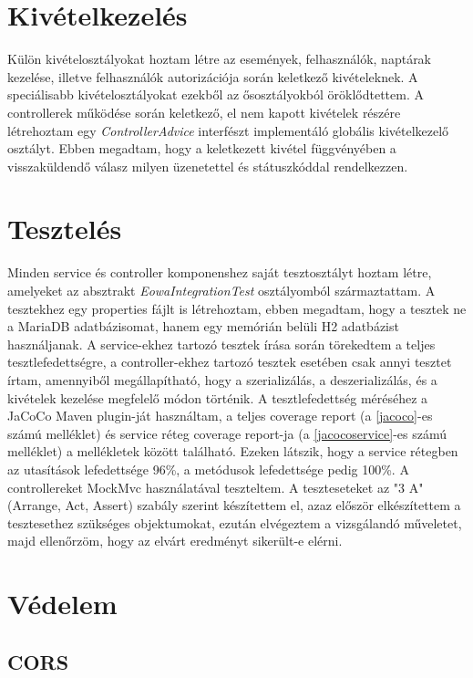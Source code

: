 \documentclass[a4paper,12pt]{report}
\theoremstyle{definition}
\theoremstyle{remark}
\begin{document}
\section{Kivételkezelés}

Külön kivételosztályokat hoztam létre az események, felhasználók, naptárak kezelése, illetve felhasználók autorizációja során keletkező kivételeknek. A speciálisabb kivételosztályokat ezekből az ősosztályokból öröklődtettem. A controllerek működése során keletkező, el nem kapott kivételek részére létrehoztam egy \textit{ControllerAdvice} interfészt implementáló globális kivételkezelő osztályt. Ebben megadtam, hogy a keletkezett kivétel függvényében a visszaküldendő válasz milyen üzenetettel és státuszkóddal rendelkezzen.

\section{Tesztelés}

Minden service és controller komponenshez saját tesztosztályt hoztam létre, amelyeket az absztrakt \textit{EowaIntegrationTest} osztályomból származtattam.  A tesztekhez egy properties fájlt is létrehoztam, ebben megadtam, hogy a tesztek ne a MariaDB adatbázisomat, hanem egy memórián belüli H2 adatbázist használjanak. A service-ekhez tartozó tesztek írása során törekedtem a teljes tesztlefedettségre, a controller-ekhez tartozó tesztek esetében csak annyi tesztet írtam, amennyiből megállapítható, hogy a szerializálás, a deszerializálás, és a kivételek kezelése megfelelő módon történik. A tesztlefedettség méréséhez a JaCoCo\cite{Jacocowebsite} Maven plugin-ját használtam, a teljes coverage report (a \ref{jacoco}-es számú melléklet)  és service réteg coverage report-ja (a \ref{jacocoservice}-es számú melléklet) a mellékletek között található. Ezeken látszik, hogy a service rétegben az utasítások lefedettsége 96\%, a metódusok lefedettsége pedig 100\%. A controllereket MockMvc használatával teszteltem. A teszteseteket az "3 A"\cite{3Awebsite} (Arrange, Act, Assert) szabály szerint készítettem el, azaz először elkészítettem a tesztesethez szükséges objektumokat, ezután elvégeztem a vizsgálandó műveletet, majd ellenőrzöm, hogy az elvárt eredményt sikerült-e elérni.

\section{Védelem}

	\subsection{CORS}
\end{document}
